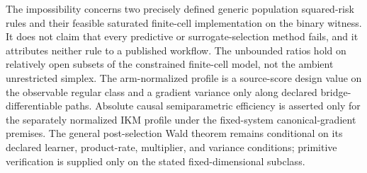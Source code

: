 The impossibility concerns two precisely defined generic population squared-risk rules and their feasible saturated finite-cell implementation on the binary witness.  It does not claim that every predictive or surrogate-selection method fails, and it attributes neither rule to a published workflow.  The unbounded ratios hold on relatively open subsets of the constrained finite-cell model, not the ambient unrestricted simplex.  The arm-normalized profile is a source-score design value on the observable regular class and a gradient variance only along declared bridge-differentiable paths.  Absolute causal semiparametric efficiency is asserted only for the separately normalized IKM profile under the fixed-system canonical-gradient premises.  The general post-selection Wald theorem remains conditional on its declared learner, product-rate, multiplier, and variance conditions; primitive verification is supplied only on the stated fixed-dimensional subclass.